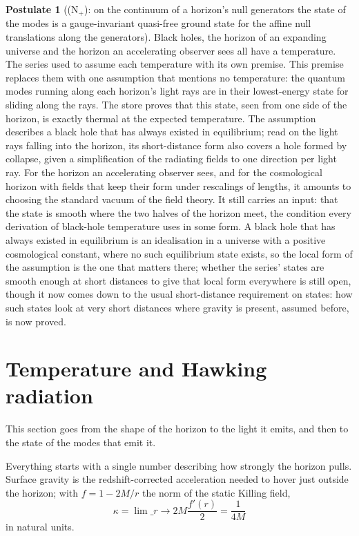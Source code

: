 \documentclass[11pt]{article}
\theoremstyle{definition}
\newtheorem{postulate}[theorem]{Postulate}
\theoremstyle{plain}
\begin{document}
\begin{postulate}[(N$_{+}$): on the continuum of a horizon's null generators the state of the modes is a gauge-invariant quasi-free ground state for the affine null translations along the generators]\label{c:synthesis.n-plus-null-ground-state}
Black holes, the horizon of an expanding universe and the horizon an accelerating observer sees all have a temperature. The series used to assume each temperature with its own premise. This premise replaces them with one assumption that mentions no temperature: the quantum modes running along each horizon's light rays are in their lowest-energy state for sliding along the rays. The store proves that this state, seen from one side of the horizon, is exactly thermal at the expected temperature. The assumption describes a black hole that has always existed in equilibrium; read on the light rays falling into the horizon, its short-distance form also covers a hole formed by collapse, given a simplification of the radiating fields to one direction per light ray. For the horizon an accelerating observer sees, and for the cosmological horizon with fields that keep their form under rescalings of lengths, it amounts to choosing the standard vacuum of the field theory. It still carries an input: that the state is smooth where the two halves of the horizon meet, the condition every derivation of black-hole temperature uses in some form. A black hole that has always existed in equilibrium is an idealisation in a universe with a positive cosmological constant, where no such equilibrium state exists, so the local form of the assumption is the one that matters there; whether the series' states are smooth enough at short distances to give that local form everywhere is still open, though it now comes down to the usual short-distance requirement on states: how such states look at very short distances where gravity is present, assumed before, is now proved.
\end{postulate}

\section{Temperature and Hawking radiation}

This section goes from the shape of the horizon to the light it emits, and then to the state of the modes that emit it.

Everything starts with a single number describing how strongly the horizon pulls. Surface gravity is the redshift-corrected acceleration needed to hover just outside the horizon; with $f = 1 - 2M/r$ the norm of the static Killing field, \[ \kappa = \lim\_{r \to 2M} \frac{f'(r)}{2} = \frac{1}{4M} \] in natural units.
\end{document}
